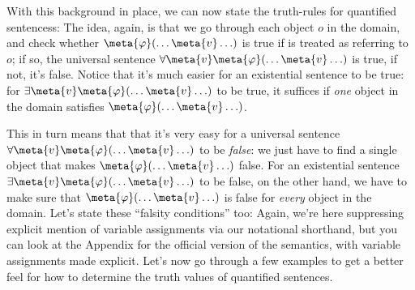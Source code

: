 With this background in place, we can now state the truth-rules for quantified sentencess:
The idea, again, is that we go through each object $o$ in the domain, and check whether $\meta{\varphi}(\ldots \meta{v} \ldots)$ is true if  is treated as referring to $o$; if so, the universal sentence $\forall \meta{v}\meta{\varphi}(\ldots \meta{v} \ldots)$ is true, if not, it's false.  Notice that it's much easier for an existential sentence to be true: for $\exists \meta{v}\meta{\varphi}(\ldots \meta{v} \ldots)$ to be true, it suffices if \emph{one} object in the domain satisfies $\meta{\varphi}(\ldots \meta{v} \ldots)$.


This in turn means that that it's very easy for a universal sentence $\forall \meta{v}\meta{\varphi}(\ldots \meta{v} \ldots)$ to be \emph{false}: we just have to find a single object that makes $\meta{\varphi}(\ldots \meta{v} \ldots)$ false.  For an existential sentence $\exists \meta{v}\meta{\varphi}(\ldots \meta{v} \ldots)$ to be false, on the other hand, we have to make sure that $\meta{\varphi}(\ldots \meta{v} \ldots)$ is false for \emph{every} object in the domain. Let's state these ``falsity conditions'' too:
Again, we're here suppressing explicit mention of variable assignments via our notational shorthand, but you can look at the Appendix for the official version of the semantics, with variable assignments made explicit.  Let's now go through a few examples to get a better feel for how to determine the truth values of quantified sentences.







